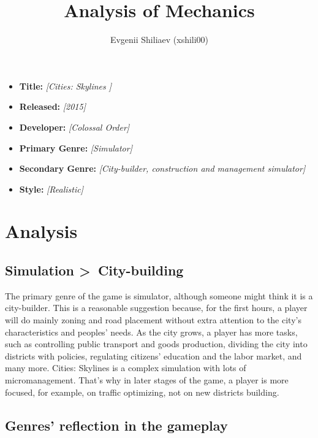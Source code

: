 \documentclass[a4paper,10pt, english]{article}
\title{Analysis of Mechanics}
\author{Evgenii Shiliaev (xshili00)}
\date{}
\newcommand{\ph}[1]{\textit{[#1]}}
\begin{document}
\maketitle
\thispagestyle{empty}

{
    \large

    \begin{itemize}

        \item[] \textbf{Title:} \ph{Cities: Skylines }

        \item[] \textbf{Released:} \ph{2015}

        \item[] \textbf{Developer:} \ph{Colossal Order}

        \item[] \textbf{Primary Genre:} \ph{Simulator}

        \item[] \textbf{Secondary Genre:} \ph{City-builder, construction and management simulator}

        \item[] \textbf{Style:} \ph{Realistic}

    \end{itemize}

}

\section*{\centering Analysis}

\subsection*{Simulation \textgreater \ City-building}
The primary genre of the game is simulator, although someone might think it is a city-builder. This is a reasonable suggestion because, for the first hours, a player will do mainly zoning and road placement without extra attention to the city's characteristics and peoples' needs. As the city grows, a player has more tasks, such as controlling public transport and goods production, dividing the city into districts with policies, regulating citizens' education and the labor market, and many more. Cities: Skylines is a complex simulation with lots of micromanagement. That's why in later stages of the game, a player is more focused, for example, on traffic optimizing, not on new districts building.

\subsection*{Genres' reflection in the gameplay}
\end{document}
